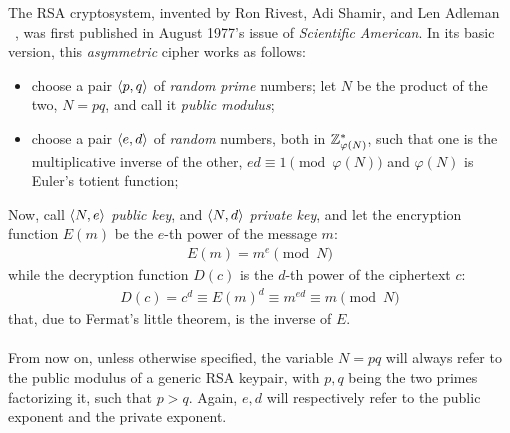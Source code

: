 The RSA cryptosystem, invented by Ron Rivest, Adi Shamir, and Len Adleman
~\cite{rsa}, was first published in August 1977's issue of
\emph{Scientific American}. In its basic version, this \emph{asymmetric} cipher
works as follows:
\begin{itemize}
  \item choose a pair $\langle p, q\rangle$ of \emph{random} \emph{prime} numbers;
    let $N$ be the product of the two, $N=pq$, and call it \emph{public modulus};
  \item choose a pair $\langle e, d\rangle$ of \emph{random} numbers, both in
    $\mathbb{Z}^*_{\varphi(N)}$, such that one is the multiplicative inverse of the
    other, $ed \equiv 1 \pmod{\varphi(N)}$ and $\varphi(N)$ is Euler's totient
    function;
\end{itemize}
Now, call $\langle N, e\rangle$ \emph{public key}, and $\langle N, d\rangle$
\emph{private key}, and let the encryption function $E(m)$ be the $e$-th power of
the message $m$:
\begin{align}
  \label{eq:rsa:encrypt}
  E(m) = m^e \pmod{N}
\end{align}
while the decryption function $D(c)$ is the $d$-th power of the ciphertext $c$:
\begin{align}
  \label{eq:rsa:decrypt}
  D(c) = c^d \equiv E(m)^d \equiv m^{ed} \equiv m \pmod{N}
\end{align}
that, due to Fermat's little theorem, is the inverse of $E$.

\paragraph{}
From now on, unless otherwise specified, the variable $N=pq$ will always refer
to the public modulus of a generic RSA keypair, with
$p, q$ being the two primes factorizing it, such that $p > q$.
 Again, $e, d$ will respectively refer to the public
exponent and the private exponent.

